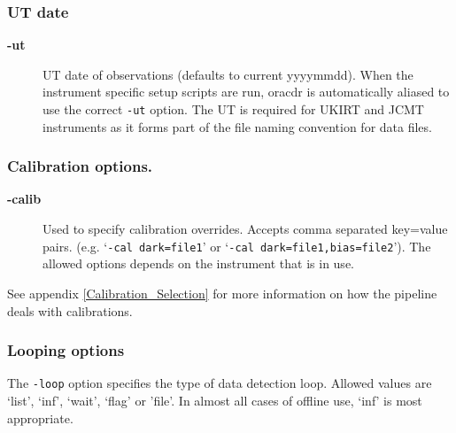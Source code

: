 \documentclass[twoside,11pt]{article}
\newcommand{\xlabel}[1]{}
\renewcommand{\_}{\texttt{\symbol{95}}}
\begin{document}
\subsubsection*{UT date\label{oracdr_UT_date}}
\begin{description}
\item[\textbf{-ut}] \mbox{}

UT date of observations (defaults to current yyyymmdd). When the
instrument specific setup scripts are run, oracdr is automatically
aliased to use the correct \texttt{-ut} option. The UT is required for
UKIRT and JCMT instruments as it forms part of the file naming
convention for data files.

\end{description}
\subsubsection*{Calibration options.\label{oracdr_Calibration_options_}\xlabel{calibration_options}}

\begin{description}
\item[\textbf{-calib}] \mbox{}

Used to specify calibration overrides. Accepts comma separated key=value
pairs. (e.g. `\texttt{-cal dark=file1}' or `\texttt{-cal dark=file1,bias=file2}'). The
allowed options depends on the instrument that is in use.

\end{description}


See appendix \ref{Calibration_Selection} for more information on
how the pipeline deals with calibrations.

\subsubsection*{Looping options\label{oracdr_Looping_options}}

The \texttt{-loop} option specifies the type of data detection loop. Allowed
values are `list', `inf', `wait', `flag' or 'file'. In almost all cases of
offline use, `inf' is most appropriate.
\end{document}
